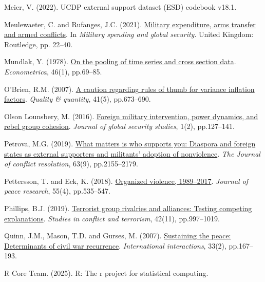 \documentclass[
]{article}
\newlength{\cslhangindent}
\newenvironment{CSLReferences}[2] %
 {\begin{list}{}{%
  \setlength{\itemindent}{0pt}
  \setlength{\leftmargin}{0pt}
  \setlength{\parsep}{0pt}
  \ifodd #1
   \setlength{\leftmargin}{\cslhangindent}
   \setlength{\itemindent}{-1\cslhangindent}
  \fi
  \setlength{\itemsep}{#2\baselineskip}}}
 {\end{list}}
\begin{document}
\begin{CSLReferences}{0}{1}
Meier, V. (2022). UCDP external support dataset (ESD) codebook v18.1.

Meulewaeter, C. and Rufanges, J.C. (2021).
\href{https://doi.org/10.4324/9781003045823-3}{Military expenditure,
arms transfer and armed conflicts}. In \emph{Military spending and
global security}. United Kingdom: Routledge, pp. 22--40.

Mundlak, Y. (1978). \href{https://doi.org/10.2307/1913646}{On the
pooling of time series and cross section data}. \emph{Econometrica},
46(1), pp.69--85.

O'Brien, R.M. (2007). \href{https://doi.org/10.1007/s11135-006-9018-6}{A
caution regarding rules of thumb for variance inflation factors}.
\emph{Quality \& quantity}, 41(5), pp.673--690.

Olson Lounsbery, M. (2016).
\href{https://doi.org/10.1093/jogss/ogw004}{Foreign military
intervention, power dynamics, and rebel group cohesion}. \emph{Journal
of global security studies}, 1(2), pp.127--141.

Petrova, M.G. (2019).
\href{https://doi.org/10.1177/0022002719826645}{What matters is who
supports you: Diaspora and foreign states as external supporters and
militants' adoption of nonviolence}. \emph{The Journal of conflict
resolution}, 63(9), pp.2155--2179.

Pettersson, T. and Eck, K. (2018).
\href{https://doi.org/10.1177/0022343318784101}{Organized violence,
1989--2017}. \emph{Journal of peace research}, 55(4), pp.535--547.

Phillips, B.J. (2019).
\href{https://doi.org/10.1080/1057610X.2018.1431365}{Terrorist group
rivalries and alliances: Testing competing explanations}. \emph{Studies
in conflict and terrorism}, 42(11), pp.997--1019.

Quinn, J.M., Mason, T.D. and Gurses, M. (2007).
\href{https://doi.org/10.1080/03050620701277673}{Sustaining the peace:
Determinants of civil war recurrence}. \emph{International
interactions}, 33(2), pp.167--193.

R Core Team. (2025). R: The r project for statistical computing.


\end{CSLReferences}
\end{document}
